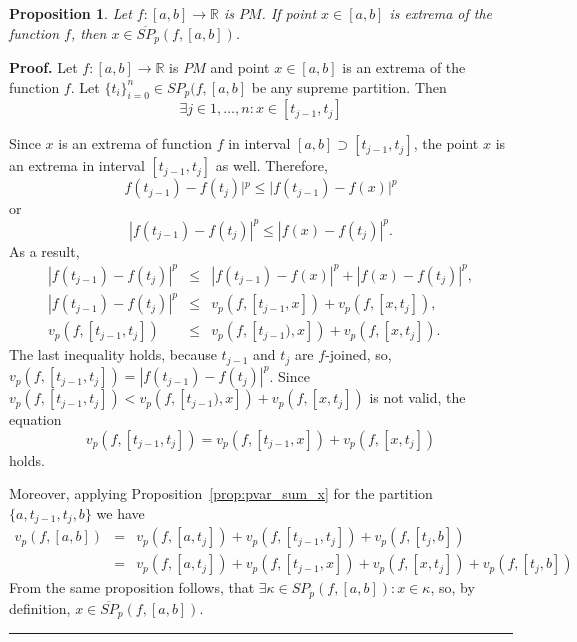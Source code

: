 \documentclass[12pt, a4paper]{article}
\newtheorem{proposition}[theorem]{Proposition}
\newenvironment{proof}[1][Proof]{\noindent \textbf{#1.} }{\  \rule{0.5em}{0.5em}}
\numberwithin{equation}{section}
\begin{document}
\begin{proposition}\label{prop:SplitMinMax}
  Let $f:[a,b] \rightarrow \mathbb{R}$ is $PM$. 
  If point $x \in [a,b]$ is extrema of the function $f$, 
  then $x \in \overline{SP}_p(f,[a, b])$.
\end{proposition}
\begin{proof}
  Let $f:[a,b] \rightarrow \mathbb{R}$ is $PM$ and
  point $x \in [a,b]$ is an extrema of the function $f$.
  Let $\{t_i\}_{i=0}^{n} \in SP_p(f,[a,b]$ 
  be any supreme partition. 
  Then
  \begin{equation}
    \exists j \in 1,\dots,n: x \in [t_{j-1},t_j] 
  \end{equation}  

  Since $x$ is an extrema of function $f$ in interval
  $[a, b] \supset [t_{j-1},t_j]$, 
  the point $x$ is an extrema in interval 
  $[t_{j-1}, t_j]$ as well. Therefore,
  \begin{equation}
    f(t_{j-1})-f(t_{j})|^p \leq |f(t_{j-1}) - f(x)|^p
  \end{equation}
  or
  \begin{equation}
    |f(t_{j-1})-f(t_{j})|^p \leq |f(x)-f(t_{j})|^p.
  \end{equation}
  As a result,
  \begin{eqnarray*}
  |f(t_{j-1})-f(t_{j})|^p 
    &\leq &|f(t_{j-1}) - f(x)|^p + |f(x) - f(t_{j})|^p,\\
  |f(t_{j-1}) - f(t_{j})|^p 
    &\leq & v_p(f, [t_{j-1}, x]) + v_p(f, [x, t_{j}]),\\
  v_p(f, [t_{j-1}, t_{j}])
    &\leq & v_p(f,[t_{j-1}), x]) + v_p(f,[x, t_{j}]).
  \end{eqnarray*}    
  The last inequality holds, because $t_{j-1}$ and  $t_{j}$
  are $f$-joined, so, 
  $v_p(f, [t_{j-1}, t_{j}])=|f(t_{j-1}) - f(t_{j})|^p$.
  Since $v_p(f, [t_{j-1}, t_{j}])
    < v_p(f,[t_{j-1}), x]) + v_p(f,[x, t_{j}])$
  is not valid, the equation
  \begin{equation}
    v_p(f, [t_{j-1}, t_{j}])
    = v_p(f,[t_{j-1}, x]) + v_p(f,[x, t_{j}])  
  \end{equation}
  holds.
  
  Moreover, applying Proposition~\ref{prop:pvar_sum_x} 
  for the partition
  $\{a, t_{j-1}, t_j, b \}$ we have 
   \begin{eqnarray*}
    v_p(f, [a, b]) &=& v_p(f,[a, t_{j}]) 
      + v_p(f,[t_{j-1}, t_{j}]) + v_p(f,[t_{j}, b]) \\
    &=& v_p(f,[a, t_{j}]) + v_p(f,[t_{j-1}, x]) 
      + v_p(f,[x, t_{j}]) + v_p(f,[t_{j}, b])
  \end{eqnarray*}
  From the same proposition follows, that
  $\exists \kappa \in SP_p(f, [a, b]):x\in\kappa$,
  so, by definition, $x \in \overline{SP}_p(f,[a, b])$.  
\end{proof}
\end{document}
